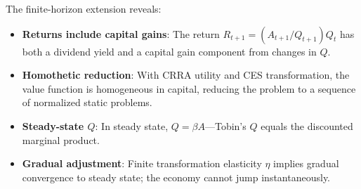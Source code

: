 \begin{callouttip}
The finite-horizon extension reveals:
\begin{itemize}[nosep]
\item \textbf{Returns include capital gains}: The return $R_{t+1} = (A_{t+1}/Q_{t+1}) Q_t$ has both a dividend yield and a capital gain component from changes in $Q$.
\item \textbf{Homothetic reduction}: With CRRA utility and CES transformation, the value function is homogeneous in capital, reducing the problem to a sequence of normalized static problems.
\item \textbf{Steady-state $Q$}: In steady state, $Q = \beta A$---Tobin's $Q$ equals the discounted marginal product.
\item \textbf{Gradual adjustment}: Finite transformation elasticity $\eta$ implies gradual convergence to steady state; the economy cannot jump instantaneously.
\end{itemize}
\end{callouttip}
